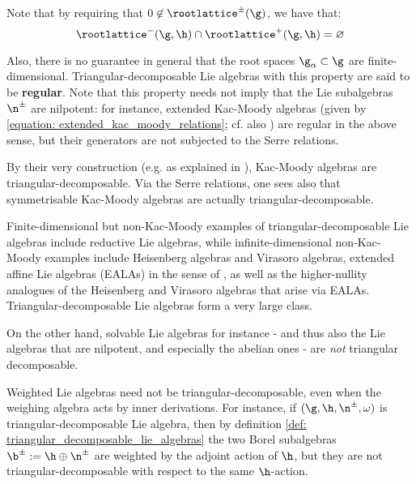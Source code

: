        \begin{remark}
            Note that by requiring that $0 \not \in \rootlattice^{\pm}(\g)$, we have that:
                $$\rootlattice^-(\g, \h) \cap \rootlattice^+(\g, \h) = \varnothing$$

            Also, there is no guarantee in general that the root spaces $\g_{\alpha} \subset \g$ are finite-dimensional. Triangular-decomposable Lie algebras with this property are said to be \textbf{regular}. Note that this property needs not imply that the Lie subalgebras $\n^{\pm}$ are nilpotent: for instance, extended Kac-Moody algebras (given by \eqref{equation: extended_kac_moody_relations}; cf. also \cite[Theorem 1.2]{kac_infinite_dimensional_lie_algebras}) are regular in the above sense, but their generators are not subjected to the Serre relations.
        \end{remark}
        \begin{example}
            By their very construction (e.g. as explained in \cite[Theorem 1.2]{kac_infinite_dimensional_lie_algebras}), Kac-Moody algebras are triangular-decomposable. Via the Serre relations, one sees also that symmetrisable Kac-Moody algebras are actually triangular-decomposable.
            
            Finite-dimensional but non-Kac-Moody examples of triangular-decomposable Lie algebras include reductive Lie algebras, while infinite-dimensional non-Kac-Moody examples include Heisenberg algebras and Virasoro algebras, extended affine Lie algebras (EALAs) in the sense of \cite{neher_lectures_on_EALAs}, as well as the higher-nullity analogues of the Heisenberg and Virasoro algebras that arise via EALAs. Triangular-decomposable Lie algebras form a very large class.

            On the other hand, solvable Lie algebras for instance - and thus also the Lie algebras that are nilpotent, and especially the abelian ones - are \textit{not} triangular decomposable.
        \end{example}
        \begin{example}
            Weighted Lie algebras need not be triangular-decomposable, even when the weighing algebra acts by inner derivations. For instance, if $(\g, \h, \n^{\pm}, \omega)$ is triangular-decomposable Lie algebra, then by definition \ref{def: triangular_decomposable_lie_algebras} the two Borel subalgebras $\b^{\pm} := \h \oplus \n^{\pm}$ are weighted by the adjoint action of $\h$, but they are not triangular-decomposable with respect to the same $\h$-action.
        \end{example}

